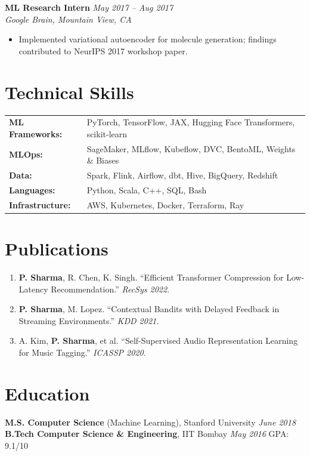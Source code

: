 \documentclass[11pt,a4paper]{article}
\begin{document}
\vspace{4pt}
\noindent\textbf{ML Research Intern} \hfill \textit{May 2017 -- Aug 2017}\\
\textit{Google Brain, Mountain View, CA}
\begin{itemize}
  \item Implemented variational autoencoder for molecule generation; findings contributed to NeurIPS 2017 workshop paper.
\end{itemize}

\section{Technical Skills}
\begin{tabular}{@{}ll}
\textbf{ML Frameworks:}    & PyTorch, TensorFlow, JAX, Hugging Face Transformers, scikit-learn \\
\textbf{MLOps:}            & SageMaker, MLflow, Kubeflow, DVC, BentoML, Weights \& Biases \\
\textbf{Data:}             & Spark, Flink, Airflow, dbt, Hive, BigQuery, Redshift \\
\textbf{Languages:}        & Python, Scala, C++, SQL, Bash \\
\textbf{Infrastructure:}   & AWS, Kubernetes, Docker, Terraform, Ray \\
\end{tabular}

\section{Publications}
\begin{enumerate}[leftmargin=*]
  \item \textbf{P. Sharma}, R. Chen, K. Singh. ``Efficient Transformer Compression for Low-Latency Recommendation.'' \textit{RecSys 2022}.
  \item \textbf{P. Sharma}, M. Lopez. ``Contextual Bandits with Delayed Feedback in Streaming Environments.'' \textit{KDD 2021}.
  \item A. Kim, \textbf{P. Sharma}, et al. ``Self-Supervised Audio Representation Learning for Music Tagging.'' \textit{ICASSP 2020}.
\end{enumerate}

\section{Education}
\textbf{M.S. Computer Science} (Machine Learning), Stanford University \hfill \textit{June 2018}\\
\textbf{B.Tech Computer Science \& Engineering}, IIT Bombay \hfill \textit{May 2016} \quad GPA: 9.1/10
\end{document}
